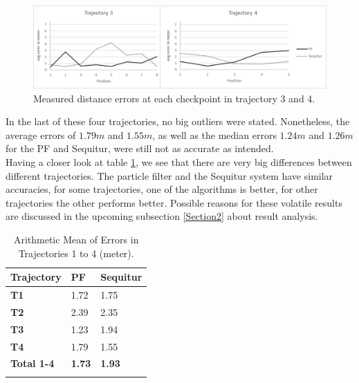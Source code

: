 \begin{figure}[th]
\centering
\includegraphics[width=1.0\textwidth]{Figures/trajectory3_4_results}
\decoRule
\caption[Localization Results of Trajectory 3 and 4]{Measured distance errors at each checkpoint in trajectory 3 and 4.}
\label{fig:trajectory3and4_results}
\end{figure}In the last of these four trajectories, no big outliers were stated. Nonetheless, the average errors of $1.79m$ and $1.55m$, as well as the median errors $1.24m$ and $1.26m$ for the PF and Sequitur, were still not as accurate as intended.\\
\noindent\hspace*{5mm}%
Having a closer look at table \ref{tab:arithmetic_errors}, we see that there are very big differences between different trajectories. The particle filter and the Sequitur system have similar accuracies, for some trajectories, one of the algorithms is better, for other trajectories the other performs better. Possible reasons for these volatile results are discussed in the upcoming subsection  \ref{Section2} about result analysis. 

\begin{table}
\caption{Arithmetic Mean of Errors in Trajectories 1 to 4 (meter).}
\label{tab:arithmetic_errors}
\centering
\begin{tabular}{l l l}
\toprule
\textbf{Trajectory} & \textbf{PF} & \textbf{Sequitur}\\
\midrule
\textbf{T1} & 1.72 & 1.75\\
\textbf{T2} & 2.39 & 2.35\\
\textbf{T3} & 1.23 & 1.94\\
\textbf{T4} & 1.79 & 1.55\\
\midrule
\textbf{Total 1-4}  & \textbf{1.73} & \textbf{1.93}\\
\bottomrule\\
\end{tabular}
\end{table}


